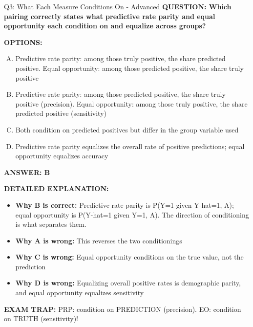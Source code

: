\documentclass[8pt]{beamer}
\begin{document}
\begin{frame}[shrink=6]{Q3: What Each Measure Conditions On - Advanced}
\fontsize{6.5}{7.5}\selectfont
\textbf{QUESTION: Which pairing correctly states what predictive rate parity and equal opportunity each condition on and equalize across groups?}

\vspace{0.1cm}
\textbf{OPTIONS:}
\begin{enumerate}[A.]
\item Predictive rate parity: among those truly positive, the share predicted positive. Equal opportunity: among those predicted positive, the share truly positive
\item Predictive rate parity: among those predicted positive, the share truly positive (precision). Equal opportunity: among those truly positive, the share predicted positive (sensitivity)
\item Both condition on predicted positives but differ in the group variable used
\item Predictive rate parity equalizes the overall rate of positive predictions; equal opportunity equalizes accuracy
\end{enumerate}

\vspace{0.1cm}
\textcolor{myblue}{\textbf{ANSWER: B}}

\vspace{0.1cm}
\textbf{DETAILED EXPLANATION:}
\begin{itemize}
\item \textbf{Why B is correct:} Predictive rate parity is P(Y=1 given Y-hat=1, A); equal opportunity is P(Y-hat=1 given Y=1, A). The direction of conditioning is what separates them.
\item \textbf{Why A is wrong:} This reverses the two conditionings
\item \textbf{Why C is wrong:} Equal opportunity conditions on the true value, not the prediction
\item \textbf{Why D is wrong:} Equalizing overall positive rates is demographic parity, and equal opportunity equalizes sensitivity
\end{itemize}

\textcolor{myred}{\textbf{EXAM TRAP:}} PRP: condition on PREDICTION (precision). EO: condition on TRUTH (sensitivity)!
\end{frame}
\end{document}
